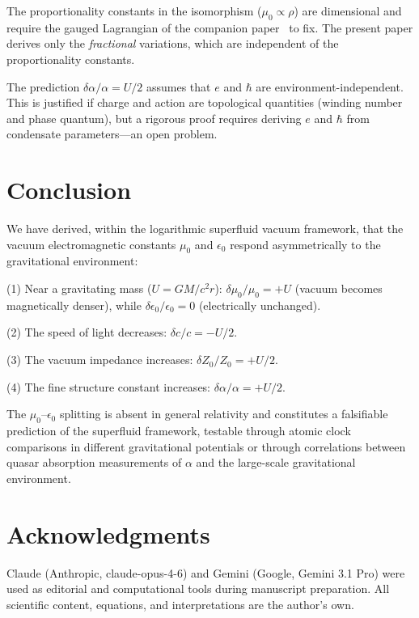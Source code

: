 \documentclass[12pt, a4paper]{article}
\begin{document}
The proportionality constants in the isomorphism
($\mu_0 \propto \rho$) are dimensional and require
the gauged Lagrangian of the companion
paper~\cite{kulangiev_maxwell} to fix. The present
paper derives only the \emph{fractional} variations,
which are independent of the proportionality
constants.

The prediction $\delta\alpha/\alpha = U/2$ assumes
that $e$ and $\hbar$ are environment-independent.
This is justified if charge and action are
topological quantities (winding number and phase
quantum), but a rigorous proof requires deriving
$e$ and $\hbar$ from condensate parameters---an
open problem.


\section{Conclusion}
\label{sec:conclusion}

We have derived, within the logarithmic superfluid
vacuum framework, that the vacuum electromagnetic
constants $\mu_0$ and $\epsilon_0$ respond
asymmetrically to the gravitational environment:

(1) Near a gravitating mass ($U = GM/c^2 r$):
$\delta\mu_0/\mu_0 = +U$ (vacuum becomes
magnetically denser), while
$\delta\epsilon_0/\epsilon_0 = 0$ (electrically
unchanged).

(2) The speed of light decreases:
$\delta c/c = -U/2$.

(3) The vacuum impedance increases:
$\delta Z_0/Z_0 = +U/2$.

(4) The fine structure constant increases:
$\delta\alpha/\alpha = +U/2$.

The $\mu_0$--$\epsilon_0$ splitting is absent in
general relativity and constitutes a falsifiable
prediction of the superfluid framework, testable
through atomic clock comparisons in different
gravitational potentials or through correlations
between quasar absorption measurements of $\alpha$
and the large-scale gravitational environment.

\newpage
\section*{Acknowledgments}

Claude (Anthropic, claude-opus-4-6) and Gemini (Google, Gemini 3.1 Pro) were used as editorial and computational tools during manuscript preparation. All scientific content, equations, and
interpretations are the author's own.
\end{document}
